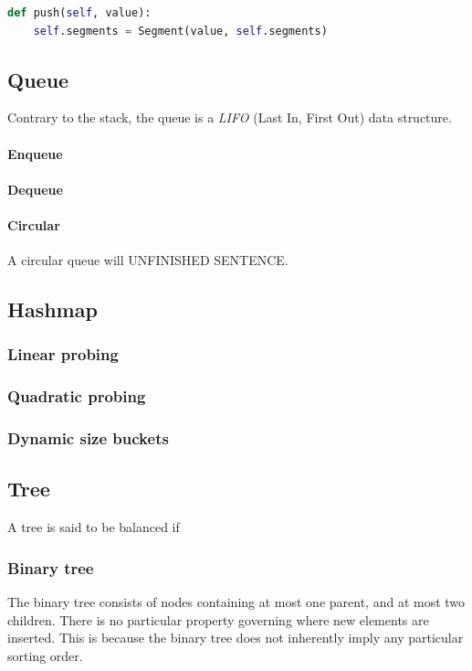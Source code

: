 \documentclass{article}
\begin{document}
\begin{lstlisting}[language=Python]
  def push(self, value):
    self.segments = Segment(value, self.segments)
\end{lstlisting}

\subsection{Queue}
Contrary to the stack, the queue is a {\em LIFO} (Last In, First Out) data structure.

\paragraph{Enqueue}
\paragraph{Dequeue}
\paragraph{Circular}
A circular queue will {\huge UNFINISHED SENTENCE}.

\newpage

\subsection{Hashmap}
\subsubsection{Linear probing}
\subsubsection{Quadratic probing}
\subsubsection{Dynamic size buckets}

\newpage

\subsection{Tree}
A tree is said to be balanced if

\subsubsection{Binary tree}
The binary tree consists of nodes containing at most one parent, and at most two children.
There is no particular property governing where new elements are inserted.
This is because the binary tree does not inherently imply any particular sorting order.
\end{document}
